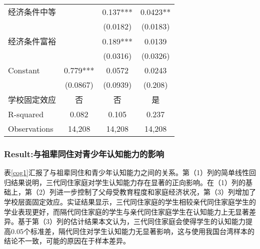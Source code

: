 \documentclass{beamer}
\begin{document}
\begin{frame}
\begin{table}[!htbp]
{\begin{tabular}{lccc}
经济条件中等       &            & 0.137***   & 0.0423**  \\
             &            & (0.0182)   & (0.0183)  \\
经济条件富裕       &            & 0.189***   & 0.0139    \\
             &            & (0.0316)   & (0.0326)  \\
Constant     & 0.779***   & 0.0572     & 0.0243    \\
             & (0.0867)   & (0.0939)   & (0.208)   \\
学校固定效应       & 否          & 否          & 是         \\
R-squared    & 0.082      & 0.105      & 0.237     \\
Observations & 14,208     & 14,208     & 14,208   \\
\hline
\end{tabular}}
\end{table}
\end{frame}

\begin{frame}
	\frametitle{Result:与祖辈同住对青少年认知能力的影响}
表\ref{cog1}汇报了与祖辈同住和青少年认知能力之间的关系。第（1）列的简单线性回归结果说明，三代同住家庭对学生认知能力存在显著的正向影响。在（1）列的基础上，第（2）列进一步控制了父母受教育程度和家庭经济状况，第（3）列增加了学校层面固定效应。实证结果显示，三代同住家庭的学生相较亲代同住家庭学生的学业表现更好，而隔代同住家庭的学生与亲代同住家庭学生在认知能力上无显著差异。基于第（3）列的估计结果本文认为，三代同住家庭会使得学生的认知能力提高0.05个标准差，隔代同住对学生认知能力无显著影响，这与\citet{pong_co-resident_2010}使用我国台湾样本的结论不一致，可能的原因在于样本差异。
\end{frame}
\end{document}
